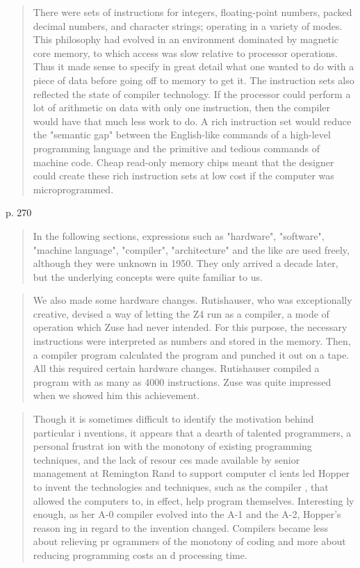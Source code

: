 \begin{quotation}
There were sets of instructions for integers, floating-point numbers, packed decimal numbers, and character
strings; operating in a variety of modes. This philosophy had evolved in an environment dominated by
magnetic core memory, to which access was slow relative to processor operations. Thus it made sense to
specify in great detail what one wanted to do with a piece of data before going off to memory to get it. The
instruction sets also reflected the state of compiler technology. If the processor could perform a lot of
arithmetic on data with only one instruction, then the compiler would have that much less work to do. A rich
instruction set would reduce the "semantic gap" between the English-like commands of a high-level
programming language and the primitive and tedious commands of machine code. Cheap read-only memory
chips meant that the designer could create these rich instruction sets at low cost if the computer was microprogrammed.
\end{quotation}

p. 270
\begin{quotation}
In the following sections, expressions such as "hardware", "software", "machine language", "compiler",
"architecture" and the like are used freely, although they were unknown in 1950. They only arrived a decade
later, but the underlying concepts were quite familiar to us.
\end{quotation}

\begin{quotation}
    We also made some hardware changes. Rutishauser, who was exceptionally creative, devised a way of
letting the Z4 run as a compiler, a mode of operation which Zuse had never intended. For this purpose, the
necessary instructions were interpreted as numbers and stored in the memory. Then, a compiler program
calculated the program and punched it out on a tape. All this required certain hardware changes. Rutishauser
compiled a program with as many as 4000 instructions. Zuse was quite impressed when we showed him this
achievement.
\end{quotation}


\begin{quotation}
Though it is sometimes difficult to identify the motivation behind particular i
nventions, it appears that a dearth of talented programmers, a personal frustrat
ion with the monotony of existing programming techniques, and the lack of resour
ces made available by senior management at Remington Rand to support computer cl
ients led Hopper to invent the technologies and techniques, such as the compiler
, that allowed the computers to, in effect, help program themselves. Interesting
ly enough, as her A-0 compiler evolved into the A-1 and the A-2, Hopper’s reason
ing in regard to the invention changed. Compilers became less about relieving pr
ogrammers of the monotony of coding and more about reducing programming costs an
d processing time.
\end{quotation}

